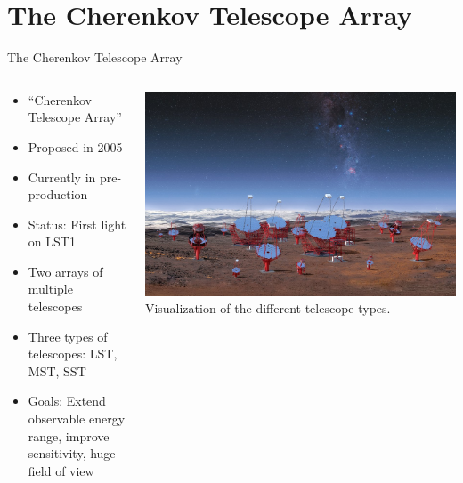 \section{The Cherenkov Telescope Array}


\begin{frame}{The Cherenkov Telescope Array}
    \begin{columns}[T] %
        \begin{column}{.45\textwidth}
            \vspace{10pt}
            \begin{itemize}
                \item ``Cherenkov Telescope Array''
                \item Proposed in 2005
                \item Currently in pre-production
                \item Status: First light on LST1
                \item Two arrays of multiple telescopes
                \item Three types of telescopes: LST, MST, SST
                \item Goals: Extend observable energy range, improve sensitivity, huge field of view
            \end{itemize}
        \end{column}%
        \hfill%
        \begin{column}{.53\textwidth}
            \includegraphics[width=\linewidth]{images/cta_telescopes.jpg}
            Visualization of the different telescope types.
            \footnotesize{\cite{cta_telescopes}}
        \end{column}%
    \end{columns}

\end{frame}



